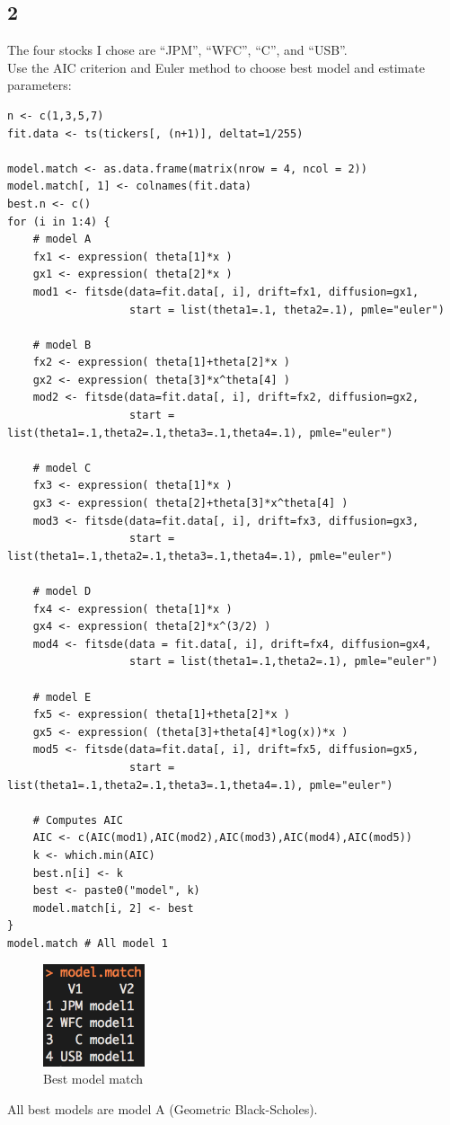 \documentclass{article}
\begin{document}
\subsection{2}
The four stocks I chose are ``JPM'', ``WFC'', ``C'', and ``USB''. \\
Use the AIC criterion and Euler method to choose best model and estimate parameters:
\begin{verbatim}
n <- c(1,3,5,7)
fit.data <- ts(tickers[, (n+1)], deltat=1/255)

model.match <- as.data.frame(matrix(nrow = 4, ncol = 2))
model.match[, 1] <- colnames(fit.data)
best.n <- c()
for (i in 1:4) {
    # model A
    fx1 <- expression( theta[1]*x )
    gx1 <- expression( theta[2]*x )
    mod1 <- fitsde(data=fit.data[, i], drift=fx1, diffusion=gx1,
                   start = list(theta1=.1, theta2=.1), pmle="euler")
    
    # model B
    fx2 <- expression( theta[1]+theta[2]*x )
    gx2 <- expression( theta[3]*x^theta[4] )
    mod2 <- fitsde(data=fit.data[, i], drift=fx2, diffusion=gx2,
                   start = list(theta1=.1,theta2=.1,theta3=.1,theta4=.1), pmle="euler")
    
    # model C
    fx3 <- expression( theta[1]*x )
    gx3 <- expression( theta[2]+theta[3]*x^theta[4] )
    mod3 <- fitsde(data=fit.data[, i], drift=fx3, diffusion=gx3,
                   start = list(theta1=.1,theta2=.1,theta3=.1,theta4=.1), pmle="euler")
    
    # model D
    fx4 <- expression( theta[1]*x )
    gx4 <- expression( theta[2]*x^(3/2) )
    mod4 <- fitsde(data = fit.data[, i], drift=fx4, diffusion=gx4,
                   start = list(theta1=.1,theta2=.1), pmle="euler")
    
    # model E
    fx5 <- expression( theta[1]+theta[2]*x )
    gx5 <- expression( (theta[3]+theta[4]*log(x))*x )
    mod5 <- fitsde(data=fit.data[, i], drift=fx5, diffusion=gx5,
                   start = list(theta1=.1,theta2=.1,theta3=.1,theta4=.1), pmle="euler")
    
    # Computes AIC
    AIC <- c(AIC(mod1),AIC(mod2),AIC(mod3),AIC(mod4),AIC(mod5))
    k <- which.min(AIC)
    best.n[i] <- k
    best <- paste0("model", k)
    model.match[i, 2] <- best
}
model.match # All model 1
\end{verbatim}

\begin{figure}[h] 
\begin{center} 
\includegraphics[width = 3cm]{bestmodel.png}  
\caption{Best model match} 
\end{center} 
\end{figure}
All best models are model A (Geometric Black-Scholes).
\end{document}
